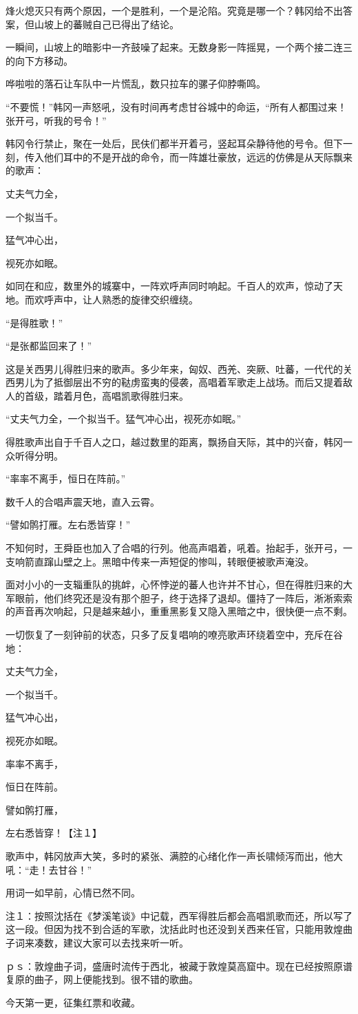 烽火熄灭只有两个原因，一个是胜利，一个是沦陷。究竟是哪一个？韩冈给不出答案，但山坡上的蕃贼自己已得出了结论。

一瞬间，山坡上的暗影中一齐鼓噪了起来。无数身影一阵摇晃，一个两个接二连三的向下方移动。

哗啦啦的落石让车队中一片慌乱，数只拉车的骡子仰脖嘶鸣。

“不要慌！”韩冈一声怒吼，没有时间再考虑甘谷城中的命运，“所有人都围过来！张开弓，听我的号令！”

韩冈令行禁止，聚在一处后，民伕们都半开着弓，竖起耳朵静待他的号令。但下一刻，传入他们耳中的不是开战的命令，而一阵雄壮豪放，远远的仿佛是从天际飘来的歌声：

丈夫气力全，

一个拟当千。

猛气冲心出，

视死亦如眠。

如同在和应，数里外的城寨中，一阵欢呼声同时响起。千百人的欢声，惊动了天地。而欢呼声中，让人熟悉的旋律交织缠绕。

“是得胜歌！”

“是张都监回来了！”

这是关西男儿得胜归来的歌声。多少年来，匈奴、西羌、突厥、吐蕃，一代代的关西男儿为了抵御层出不穷的鞑虏蛮夷的侵袭，高唱着军歌走上战场。而后又提着敌人的首级，踏着月色，高唱凯歌得胜归来。

“丈夫气力全，一个拟当千。猛气冲心出，视死亦如眠。”

得胜歌声出自于千百人之口，越过数里的距离，飘扬自天际，其中的兴奋，韩冈一众听得分明。

“率率不离手，恒日在阵前。”

数千人的合唱声震天地，直入云霄。

“譬如鹘打雁。左右悉皆穿！”

不知何时，王舜臣也加入了合唱的行列。他高声唱着，吼着。抬起手，张开弓，一支响箭直蹿山壁之上。黑暗中传来一声短促的惨叫，转眼便被歌声淹没。

面对小小的一支辎重队的挑衅，心怀悖逆的蕃人也许并不甘心，但在得胜归来的大军眼前，他们终究还是没有那个胆子，终于选择了退却。僵持了一阵后，淅淅索索的声音再次响起，只是越来越小，重重黑影复又隐入黑暗之中，很快便一点不剩。

一切恢复了一刻钟前的状态，只多了反复唱响的嘹亮歌声环绕着空中，充斥在谷地：

丈夫气力全，

一个拟当千。

猛气冲心出，

视死亦如眠。

率率不离手，

恒日在阵前。

譬如鹘打雁，

左右悉皆穿！【注１】

歌声中，韩冈放声大笑，多时的紧张、满腔的心绪化作一声长啸倾泻而出，他大吼：“走！去甘谷！”

用词一如早前，心情已然不同。

注１：按照沈括在《梦溪笔谈》中记载，西军得胜后都会高唱凯歌而还，所以写了这一段。但因为找不到合适的军歌，沈括此时也还没到关西来任官，只能用敦煌曲子词来凑数，建议大家可以去找来听一听。

ｐｓ：敦煌曲子词，盛唐时流传于西北，被藏于敦煌莫高窟中。现在已经按照原谱复原的曲子，网上便能找到。很不错的歌曲。

今天第一更，征集红票和收藏。


